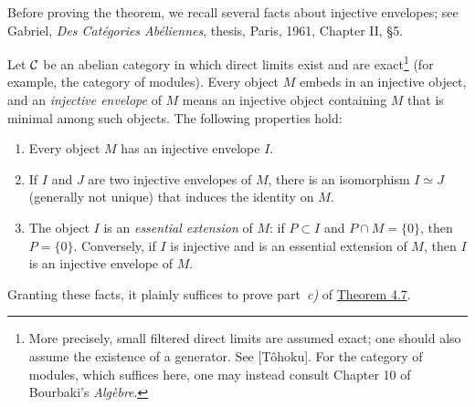 Before proving the theorem, we recall several facts about injective
envelopes; see Gabriel, \emph{Des Cat\'egories Ab\'eliennes}, thesis,
Paris, 1961, Chapter II, \S5.

Let $\mathcal C$ be an abelian category in which direct limits exist and are
exact\footnote{More precisely, small filtered direct limits are assumed
exact; one should also assume the existence of a generator. See
  [T\^ohoku]. For the category of modules, which suffices here, one may
instead consult Chapter 10 of Bourbaki's \emph{Alg\`ebre}.}
(for example, the category of modules). Every object $M$ embeds in an
injective object, and an \emph{injective envelope} of $M$ means an injective
object containing $M$ that is minimal among such objects. The following
properties hold:
\begin{enumerate}[label=\textup{\roman*)},leftmargin=2.7em]
\item Every object $M$ has an injective envelope $I$.
\item If $I$ and $J$ are two injective envelopes of $M$, there is an
isomorphism $I\simeq J$ (generally not unique) that induces the identity on
$M$.
\item The object $I$ is an \emph{essential extension} of $M$: if
$P\subset I$ and $P\cap M=\{0\}$, then $P=\{0\}$. Conversely, if $I$ is
injective and is an essential extension of $M$, then $I$ is an injective
envelope of $M$.
\end{enumerate}

Granting these facts, it plainly suffices to prove part~\emph{c)} of
\hyperref[IV.4.7]{Theorem 4.7}.

